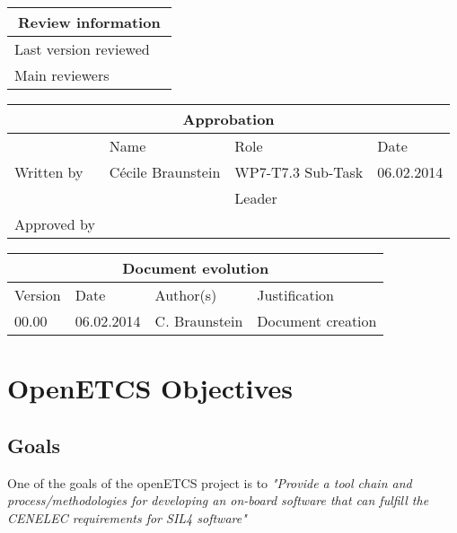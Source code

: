\documentclass{openetcs_report}
\begin{document}
\begin{tabular}{|p{4.4cm}|p{8.7cm}|}
\hline
\multicolumn{2}{|c|}{Review information} \\
\hline
Last version reviewed &  \\
\hline
Main reviewers &  \\
\hline
\end{tabular}

\begin{tabular}{|p{2.2cm}|p{4cm}|p{4cm}|p{2cm}|}
\hline
\multicolumn{4}{|c|}{Approbation} \\
\hline
  &  Name & Role & Date   \\
\hline  
Written by    &  Cécile Braunstein & WP7-T7.3 Sub-Task  & 06.02.2014 \\
&  & Leader&\\
\hline
Approved by &  &   &  \\
\hline
\end{tabular}

\begin{tabular}{|p{2.2cm}|p{2cm}|p{3cm}|p{5cm}|}
\hline
\multicolumn{4}{|c|}{Document evolution} \\
\hline
Version &  Date & Author(s) & Justification  \\
\hline  
00.00 & 06.02.2014 & C. Braunstein  &  Document creation  \\


\hline  
\end{tabular}
\newpage


\mainmatter







\chapter{OpenETCS Objectives}
\label{chap-1}
\section{Goals}
\label{sec-1-1}
One of the goals of the openETCS project is to {\em "Provide a tool chain and process/methodologies for developing an on-board software that can fulfill the CENELEC requirements for SIL4 software"}
\end{document}
